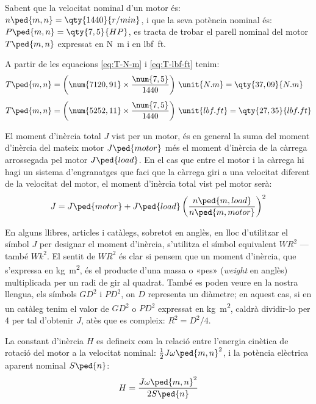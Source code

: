	
\begin{exemple}[\MotorParellNom{}]
	\addcontentsxms{\MotorParellNom}
    Sabent que la velocitat nominal d'un motor és: $n\ped{m,n} = \qty{1440}{r/min}$, i que la seva potència nominal és: $P\ped{m,n} = \qty{7,5}{HP}$,   es tracta de trobar el parell nominal del motor $T\ped{m,n}$ expressat en \unit{N.m} i en \unit{lbf.ft}.

    A partir de les equacions  \eqref{eq:T-N-m} i \eqref{eq:T-lbf-ft} tenim:
    \begin{align*}
      T\ped{m,n} &= \left(\num{7120,91} \times \frac{\num{7,5}}{1440}\right)
      \,\unit{N.m} = \qty{37,09}{N.m} \\[1ex]
      T\ped{m,n} &= \left(\num{5252,11} \times \frac{\num{7,5}}{1440}\right)
      \,\unit{lbf.ft} = \qty{27,35}{lbf.ft}
    \end{align*}
\end{exemple}


El moment d'inèrcia total $J$ vist per un motor, és en general la suma del moment d'inèrcia del mateix motor  $J\ped{motor}$ més el moment d'inèrcia de la càrrega arrossegada pel motor $J\ped{load}$. En el cas que entre el motor i la càrrega hi hagi un sistema d'engranatges que faci que la càrrega giri a una velocitat diferent de la velocitat del motor, el  moment d'inèrcia total vist pel motor serà:
\begin{equation}\index{moment!d'inèrcia}\index{J@$J$}
    J = J\ped{motor} +  J\ped{load}
    \left(\frac{n\ped{m,load}}{n\ped{m,motor}}\right)^2
\end{equation}

En alguns llibres, articles i catàlegs, sobretot en anglès, en lloc d'utilitzar el símbol $J$ per designar el moment d'inèrcia, s'utilitza el símbol equivalent $WR^2$ ---també $Wk^2$. El sentit de $WR^2$ és clar si pensem que un moment d'inèrcia, que s'expressa en \unit{kg.m^2},  és el producte d'una massa o «pes» (\textit{weight} en anglès) multiplicada per un radi de gir al quadrat. També es poden veure en la nostra llengua, els símbols $GD^2$ i $PD^2$, on $D$ representa un diàmetre; en aquest cas, si en un catàleg tenim el valor de $GD^2$ o $PD^2$ expressat en \unit{kg.m^2}, caldrà dividir-lo per 4 per tal d'obtenir $J$, atès que es compleix: $R^2 = D^2/4$.

La constant d'inèrcia $H$ es defineix com la relació entre l'energia cinètica de rotació del motor  a la velocitat nominal: $\frac{1}{2} J \omega\ped{m,n}^2$, i la  potència elèctrica aparent nominal $S\ped{n}$:
\begin{equation}\index{constants!d'inèrcia}\index{H@$H$}
    H = \frac{J \omega\ped{m,n}^2}{2 S\ped{n}}
\end{equation}

